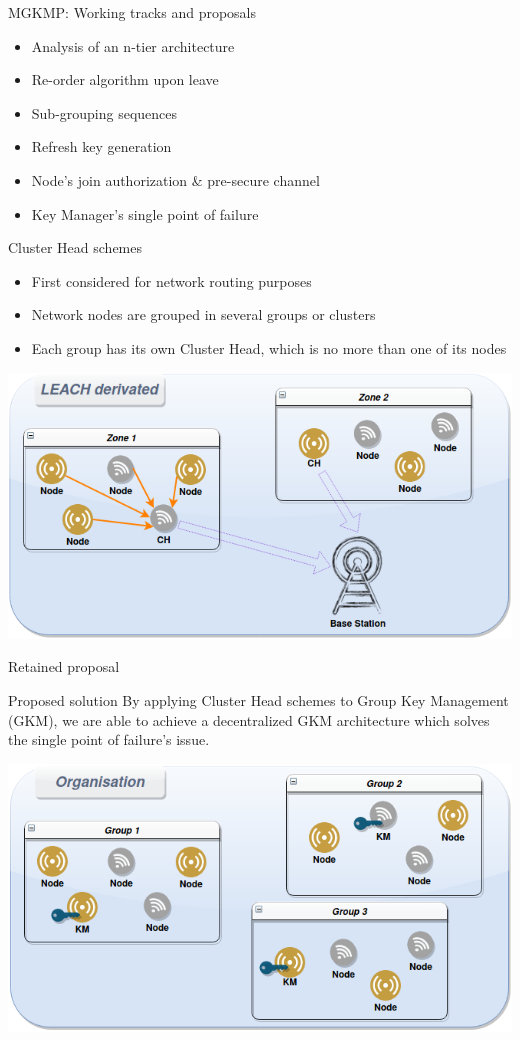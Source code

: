 \documentclass{beamer}
\begin{document}
\begin{frame}{MGKMP: Working tracks and proposals}
	\begin{itemize}
		\item Analysis of an n-tier architecture
		\item Re-order algorithm upon leave
		\item Sub-grouping sequences
		\item Refresh key generation
		\item Node’s join authorization \& pre-secure channel
		\item Key Manager's single point of failure
	\end{itemize}
\end{frame}

\begin{frame}{Cluster Head schemes}
	\begin{itemize}
		\item First considered for network routing purposes
		\item Network nodes are grouped in several groups or clusters
		\item Each group has its own Cluster Head, which is no more than one of its nodes
	\end{itemize}
	\vfill
	\centering
	\includegraphics[scale=0.35]{figures/LEACH.png}
\end{frame}

\begin{frame}{Retained proposal}
	\begin{alertblock}{Proposed solution}
		By applying Cluster Head schemes to Group Key Management (GKM), we are able to achieve a decentralized GKM architecture which solves the single point of failure's issue. 
	\end{alertblock}
	\vfill
	\centering
	\includegraphics[scale=0.32]{figures/organisation.png}
\end{frame}
\end{document}
